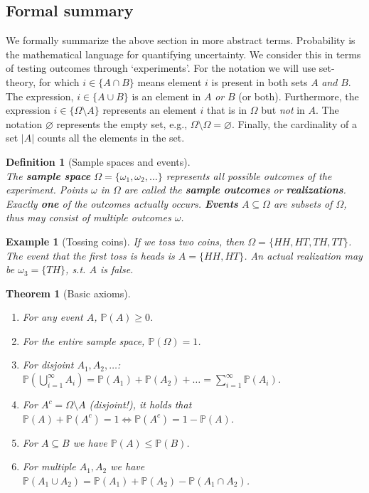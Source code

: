 \documentclass{article}
\newtheorem{definition}{Definition}
\newtheorem{theorem}{Theorem}
\newtheorem{example}{Example}
\begin{document}
\subsection{Formal summary}
We formally summarize the above section in more abstract terms. Probability is the mathematical language for quantifying uncertainty. We consider this in terms of testing outcomes through `experiments'. For the notation we will use set-theory, for which $i\in\{A\cap B\}$ means element $i$ is present in both sets $A$ \textit{and} $B$. The expression, $i\in\{A\cup B\}$ is an element in $A$ \textit{or} $B$ (or both). Furthermore, the expression $i\in\{\Omega\setminus A\}$ represents an element $i$ that is in $\Omega$ but \textit{not} in $A$. The notation $\varnothing$ represents the empty set, e.g., $\Omega\setminus\Omega=\varnothing$. Finally, the cardinality of a set $|A|$ counts all the elements in the set.
\begin{definition}[Sample spaces and events]\ \\
    The \textbf{sample space} $\Omega=\{\omega_1,\omega_2,\dots\}$ represents all possible outcomes of the experiment. Points $\omega$ in $\Omega$ are called the \textbf{sample outcomes} or \textbf{realizations}. Exactly \textbf{one} of the outcomes actually occurs. \textbf{Events} $A\subseteq\Omega$ are subsets of $\Omega$, thus may consist of multiple outcomes $\omega$.
\end{definition}
\begin{example}[Tossing coins]
    If we toss two coins, then $\Omega=\{HH,HT,TH,TT\}$. The event that the first toss is heads is $A=\{HH,HT\}$. An actual realization may be $\omega_3=\{TH\}$, s.t. $A$ is false.
\end{example}
\begin{theorem}[Basic axioms]
    \ 
    \begin{enumerate}\itemsep0em
        \item For any event $A$, $\mathbb{P}(A)\geq 0$.
        \item For the entire sample space, $\mathbb{P}(\Omega)=1$.
        \item For disjoint $A_1,A_2,\dots$: $\mathbb{P}(\bigcup_{i=1}^\infty A_i)=\mathbb{P}(A_1)+\mathbb{P}(A_2)+\dots=\sum_{i=1}^\infty \mathbb{P}(A_i)$.
        \item[$\Rightarrow$] For $A^c=\Omega\setminus A$ (disjoint!), it holds that $\mathbb{P}(A)+\mathbb{P}(A^c)=1 \Longleftrightarrow\mathbb{P}(A^c)=1-\mathbb{P}(A)$.
        \item[$\Rightarrow$] For $A\subseteq B$ we have $\mathbb{P}(A)\leq \mathbb{P}(B)$.
        \item[$\Rightarrow$] For multiple $A_1,A_2$ we have $\mathbb{P}(A_1 \cup A_2)=\mathbb{P}(A_1)+\mathbb{P}(A_2)-\mathbb{P}(A_1\cap A_2)$.
    \end{enumerate}
\end{theorem}
\end{document}
